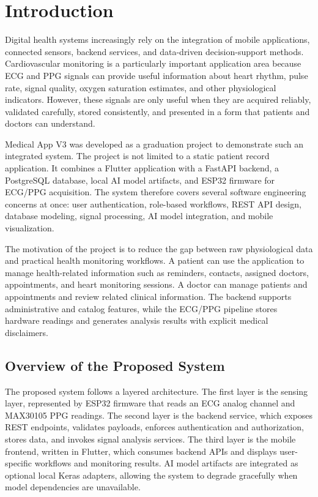 \chapter{Introduction}

Digital health systems increasingly rely on the integration of mobile applications, connected sensors, backend services, and data-driven decision-support methods. Cardiovascular monitoring is a particularly important application area because ECG and PPG signals can provide useful information about heart rhythm, pulse rate, signal quality, oxygen saturation estimates, and other physiological indicators. However, these signals are only useful when they are acquired reliably, validated carefully, stored consistently, and presented in a form that patients and doctors can understand.

Medical App V3 was developed as a graduation project to demonstrate such an integrated system. The project is not limited to a static patient record application. It combines a Flutter application with a FastAPI backend, a PostgreSQL database, local AI model artifacts, and ESP32 firmware for ECG/PPG acquisition. The system therefore covers several software engineering concerns at once: user authentication, role-based workflows, REST API design, database modeling, signal processing, AI model integration, and mobile visualization.

The motivation of the project is to reduce the gap between raw physiological data and practical health monitoring workflows. A patient can use the application to manage health-related information such as reminders, contacts, assigned doctors, appointments, and heart monitoring sessions. A doctor can manage patients and appointments and review related clinical information. The backend supports administrative and catalog features, while the ECG/PPG pipeline stores hardware readings and generates analysis results with explicit medical disclaimers.

\section{Overview of the Proposed System}

The proposed system follows a layered architecture. The first layer is the sensing layer, represented by ESP32 firmware that reads an ECG analog channel and MAX30105 PPG readings. The second layer is the backend service, which exposes REST endpoints, validates payloads, enforces authentication and authorization, stores data, and invokes signal analysis services. The third layer is the mobile frontend, written in Flutter, which consumes backend APIs and displays user-specific workflows and monitoring results. AI model artifacts are integrated as optional local Keras adapters, allowing the system to degrade gracefully when model dependencies are unavailable.


